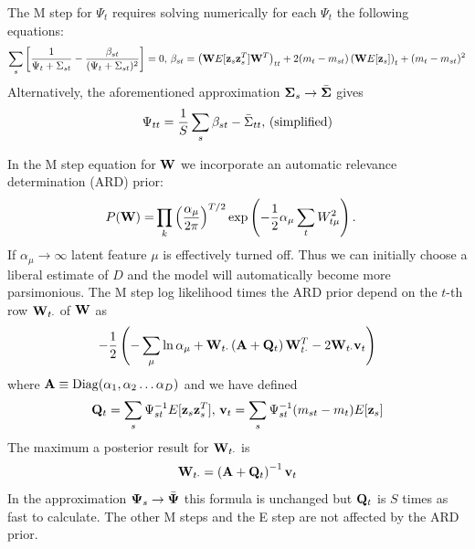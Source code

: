 \documentclass[nofootinbib,amssymb,amsmath]{revtex4}
\newcommand{\vv}{{\bf v}}
\newcommand{\vz}{{\bf z}}
\newcommand{\vQ}{{\bf Q}}
\newcommand{\vW}{{\bf W}}
\newcommand{\vPsi}{{\bf \Psi}}
\newcommand{\vSigma}{{\bf \Sigma}}
\newcommand{\vA}{{\bf A}}
\begin{document}
The M step for $\Psi_t$ requires solving numerically for each $\Psi_t$ the following equations:
\begin{align}
\sum_s \left[ \frac{1}{\Psi_t + \Sigma_{st}} - \frac{\beta_{st}}{(\Psi_t + \Sigma_{st})^2} \right] = 0, \, \beta_{st} =\left( \vW E[\vz_s \vz_s^T] \vW^T \right)_{tt} +2 (m_t - m_{st}) \left( \vW E[\vz_s] \right)_t + (m_t - m_{st})^2
\end{align}
Alternatively, the aforementioned approximation $\vSigma_s \rightarrow \bar{\vSigma}$ gives
%
\begin{equation}
\Psi_{tt} = \frac{1}{S} \sum_s \beta_{st} - \bar{\Sigma}_{tt}, \, {\rm (simplified)}
\end{equation}
%

In the M step equation for $\vW$ we incorporate an automatic relevance determination (ARD) prior:
%
\begin{align}
P(\vW) =& \prod_k \left( \frac{\alpha_\mu}{2 \pi} \right)^{T/2} \exp \left( -\frac{1}{2} \alpha_\mu \sum_t W_{t\mu}^2  \right).
\end{align}
%
If $\alpha_\mu \rightarrow \infty$ latent feature $\mu$ is effectively turned off.  Thus we can initially choose a liberal estimate of $D$ and the model will automatically become more parsimonious.  The M step log likelihood times the ARD prior depend on the $t$-th row $\vW_{t \cdot}$ of $\vW$ as
%
\begin{equation}
 -\frac{1}{2}   \left( -\sum_\mu \ln \alpha_\mu  + \vW_{t \cdot} \left(\vA +  \vQ_t  \right) \vW_{t \cdot}^T - 2 \vW_{t \cdot} \vv_t  \right) 
 \label{ARD_likelihood}
\end{equation}
%
where $\vA \equiv {\rm Diag}(\alpha_1, \alpha_2 \ldots \alpha_D)$ and we have defined
%
\begin{equation}
\vQ_t = \sum_s \Psi_{st}^{-1} E[\vz_s \vz_s^T], \, \vv_t = \sum_s \Psi_{st}^{-1} (m_{st} - m_t)E[\vz_s ]
\end{equation}
%
The maximum a posterior result for $\vW_{t \cdot}$ is
%
\begin{equation}
\vW_{t \cdot} = \left(  \vA + \vQ_t \right)^{-1} \vv_t
\label{M_step_W}
\end{equation}
%
In the approximation $\vPsi_s \rightarrow \bar{\vPsi}$ this formula is unchanged but $\vQ_t$ is $S$ times as fast to calculate.  The other M steps and the E step are not affected by the ARD prior.
\end{document}

